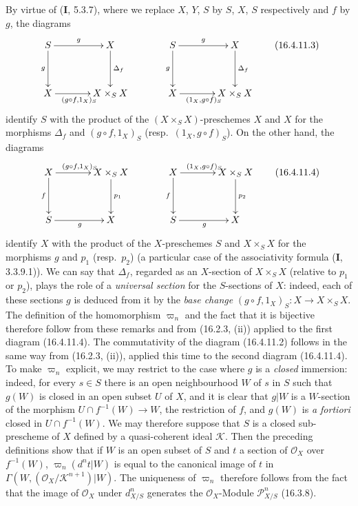 By virtue of (\textbf{I}, 5.3.7), where we replace $X$, $Y$, $S$ by $S$, $X$, $S$
respectively and $f$ by $g$, the diagrams
\[
  \xymatrix@=3pc{
    S\ar[r]^-g\ar[d]_-g&X\ar[d]^-{\Delta_f}
      &S\ar[r]^-g\ar[d]_-g&X\ar[d]^-{\Delta_f}\\
    X\ar[r]_{(g\circ f,1_X)_S}&X\times_S X
      &X\ar[r]_{(1_X,g\circ f)_S}&X\times_S X
  }
  \tag{16.4.11.3}
  \label{IV.16.4.11.3}
\]
identify $S$ with the product of the $(X\times_S X)$-preschemes $X$ and $X$ for the
morphisms $\Delta_f$ and $(g\circ f,1_X)_S$ (resp.\ $(1_X,g\circ f)_S$).
On the other hand, the diagrams
\[
  \xymatrix@=3pc{
    X\ar[r]^{(g\circ f,1_X)_S}\ar[d]_-f&X\times_S X\ar[d]^-{p_1}
      &X\ar[r]^{(1_X,g\circ f)_S}\ar[d]_-f&X\times_S X\ar[d]^-{p_2}\\
    S\ar[r]_{g}&X&S\ar[r]_{g}&X
  }
  \tag{16.4.11.4}
  \label{IV.16.4.11.4}
\]
identify $X$ with the product of the $X$-preschemes $S$ and $X\times_S X$ for the
morphisms $g$ and $p_1$ (resp.\ $p_2$) (a particular case of the associativity
formula (\textbf{I}, 3.3.9.1)). We can say that $\Delta_f$, regarded as an
$X$-section of $X\times_S X$ (relative to $p_1$ or $p_2$), plays the role
of a \emph{universal section} for the $S$-sections of $X$: indeed, each of these
sections $g$ is deduced from it by the \emph{base change}
$(g\circ f,1_X)_S:X\to X\times_S X$. The definition of the homomorphism
$\varpi_n$ and the fact that it is bijective therefore follow from these
remarks and from (16.2.3, (ii)) applied to the first diagram (16.4.11.4). The
commutativity of the diagram (16.4.11.2) follows in the same way from
(16.2.3, (ii)), applied this time to the second diagram (16.4.11.4). To make
$\varpi_n$ explicit, we may restrict to the case where $g$ is a \emph{closed}
immersion: indeed, for every $s\in S$ there is an open neighbourhood $W$ of $s$
in $S$ such that $g(W)$ is closed in an open subset $U$ of $X$, and it is clear
that $g|W$ is a $W$-section of the morphism $U\cap f^{-1}(W)\to W$, the
restriction of $f$, and $g(W)$ is \emph{a fortiori} closed in
$U\cap f^{-1}(W)$. We may therefore suppose that $S$ is a closed
sub-prescheme of $X$ defined by a quasi-coherent ideal $\mathscr{K}$.
Then the preceding definitions show that if $W$ is an open subset of $S$ and
$t$ a section of $\mathcal{O}_X$ over $f^{-1}(W)$,
$\varpi_n(d^n t|W)$ is equal to the canonical image of $t$ in
$\Gamma(W,(\mathcal{O}_X/\mathscr{K}^{n+1})|W)$. The uniqueness of $\varpi_n$
therefore follows from the fact that the image of $\mathcal{O}_X$ under
$d_{X/S}^n$ generates the $\mathcal{O}_X$-Module $\mathscr{P}_{X/S}^n$ (16.3.8).

